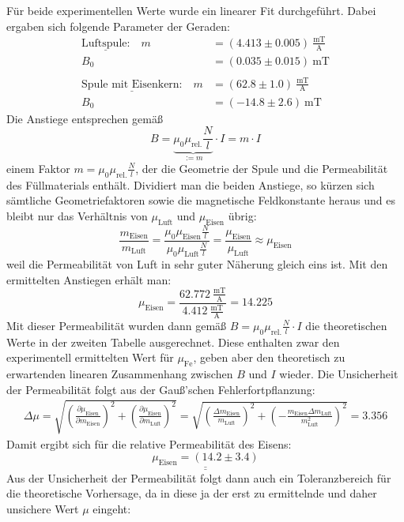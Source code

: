 \documentclass[german,  %
parskip=full,  %
]{scrartcl}
\begin{document}
Für beide experimentellen Werte wurde ein linearer Fit durchgeführt. Dabei ergaben sich folgende Parameter der Geraden:
\begin{align*}
\underline{\text{Luftspule:}} \quad m &= (4.413 \pm 0.005) \ \frac{\mathrm{mT}}{\mathrm{A}} \\
B_0 &= (0.035 \pm 0.015) \ \mathrm{mT} \\\\
\underline{\text{Spule mit Eisenkern:}}\quad m &= (62.8 \pm 1.0) \ \frac{\mathrm{mT}}{\mathrm{A}}\\
B_0 &= (-14.8 \pm 2.6) \ \mathrm{mT}
\end{align*}
Die Anstiege entsprechen gemäß
\[B = \underbrace{\mu_0\mu_{\mathrm{rel.}}\frac{N}{l}}_{:=m}\cdot I = m\cdot I\]
einem Faktor \(m= \mu_0\mu_{\mathrm{rel.}}\frac{N}{l}\), der die Geometrie der Spule und die Permeabilität des Füllmaterials enthält. Dividiert man die beiden Anstiege, so kürzen sich sämtliche Geometriefaktoren sowie die magnetische Feldkonstante heraus und es bleibt nur das Verhältnis von \(\mu_{\mathrm{Luft}}\) und \(\mu_{\mathrm{Eisen}}\) übrig:
\[\frac{m_{\mathrm{Eisen}}}{m_{\mathrm{Luft}}} = \frac{\mu_0\mu_{\mathrm{Eisen}}\frac{N}{l}}{\mu_0\mu_{\mathrm{Luft}}\frac{N}{l}} = \frac{\mu_{\mathrm{Eisen}}}{\mu_{\mathrm{Luft}}} \approx \mu_{\mathrm{Eisen}}\]
weil die Permeabilität von Luft in sehr guter Näherung gleich eins ist. Mit den ermittelten Anstiegen erhält man:
\[\mu_{\mathrm{Eisen}} = \frac{62.772 \ \frac{\mathrm{mT}}{\mathrm{A}}}{4.412 \ \frac{\mathrm{mT}}{\mathrm{A}}} = 14.225\]
Mit dieser Permeabilität wurden dann gemäß \(B = \mu_0\mu_{\mathrm{rel.}}\frac{N}{l}\cdot I \) die theoretischen Werte in der zweiten Tabelle ausgerechnet. Diese enthalten zwar den experimentell ermittelten Wert für \(\mu_{\mathrm{Fe}}\), geben aber den theoretisch zu erwartenden linearen Zusammenhang zwischen \(B\) und \(I\) wieder. Die Unsicherheit der Permeabilität folgt aus der Gauß'schen Fehlerfortpflanzung:
\begin{align*}
\Delta\mu = \sqrt{\left(\frac{\partial\mu_{\mathrm{Eisen}}}{\partial m_{\mathrm{Eisen}}}\right)^2 + \left(\frac{\partial\mu_{\mathrm{Eisen}}}{\partial m_{\mathrm{Luft}}}\right)^2} = \sqrt{\left(\frac{\Delta m_{\mathrm{Eisen}}}{m_{\mathrm{Luft}}}\right)^2 + \left( - \frac{m_{\mathrm{Eisen}}\Delta m_{\mathrm{Luft}}}{m_{\mathrm{Luft}}^2}\right)^2} = 3.356
\end{align*}
Damit ergibt sich für die relative Permeabilität des Eisens:
\[\underline{\underline{\mu_{\mathrm{Eisen}} = (14.2 \pm 3.4)}}\]
Aus der Unsicherheit der Permeabilität folgt dann auch ein Toleranzbereich für die theoretische Vorhersage, da in diese ja der erst zu ermittelnde und daher unsichere Wert \(\mu\) eingeht:
\end{document}
